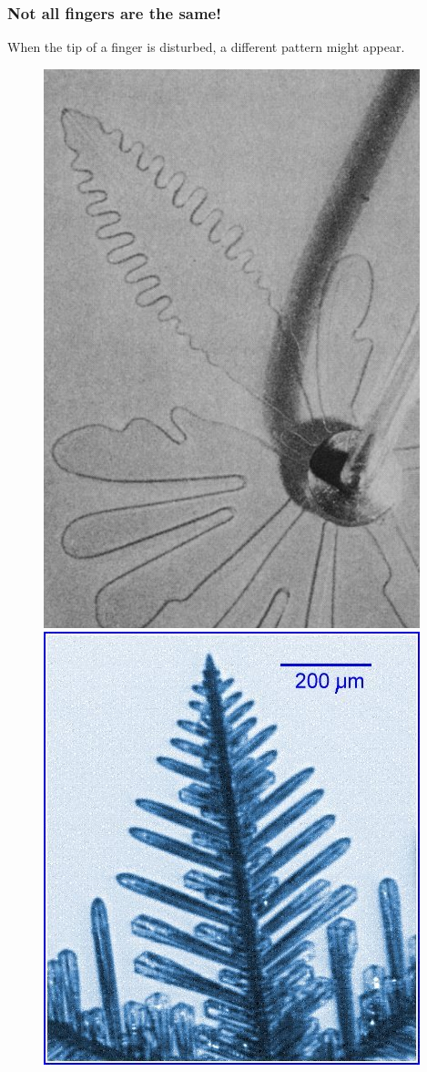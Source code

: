 \documentclass{beamer}
\begin{document}
\begin{frame}
\frametitle{Not all fingers are the same!}
When the tip of a finger is disturbed, a different pattern might appear.
\begin{figure}[!tbp]
    \centering
    \begin{minipage}[b]{0.3\textwidth}
    \includegraphics[scale=0.26]{finger.png}
    \end{minipage}
    \begin{minipage}[b]{0.3\textwidth}
    \includegraphics[scale=0.25]{dendrite.jpg}

\end{minipage}
\end{figure}
\end{frame}
\end{document}
